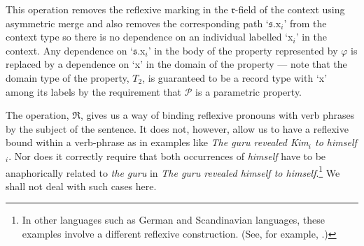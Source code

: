 This operation removes the reflexive marking in the
$\mathfrak{r}$-field of the context using asymmetric merge and also
removes the corresponding path `$\mathfrak{s}.\text{x}_i$' from the
context type so there is no dependence on an individual labelled
`x$_i$' in the context.  Any dependence on `$\mathfrak{s}$.x$_i$' in
the body of the property represented by $\varphi$ is replaced by a
dependence on `x' in the domain of the property --- note that the
domain type of the property, $T_2$, is guaranteed to be a record type
with `x' among its labels by the requirement that $\mathcal{P}$ is a
parametric property.

The operation, $\mathfrak{R}$, gives us a way of binding reflexive
pronouns with verb phrases by the subject of the sentence.  It does
not, however, allow us to have a reflexive bound within a verb-phrase
as in examples like \textit{The guru revealed Kim$_i$ to
  himself$_i$}.  Nor does it correctly require that both occurrences
of \textit{himself} have to be anaphorically related to \textit{the
  guru} in \textit{The guru revealed himself to himself}.\footnote{In
  other languages such as German and Scandinavian languages, these
  examples involve a different reflexive construction.  (See, for
  example, \citealp{Hellan1986}.)}  We shall not deal with such cases
here.

